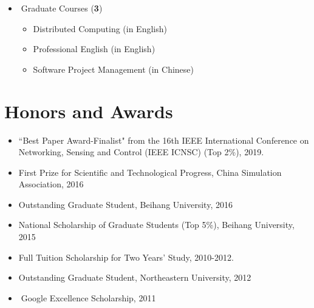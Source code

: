 \documentclass[margin,line]{res}
\begin{document}
\begin{resume}
\begin{itemize}
	\item Graduate Courses (\textbf{3})
	\begin{itemize}
		\item Distributed Computing (in English)
		\item Professional English (in English)
		\item Software Project Management (in Chinese)
	\end{itemize}
\end{itemize}

\section{\sc Honors and Awards}

\begin{itemize}
	\item ``Best Paper Award-Finalist" from the 16th IEEE International Conference on Networking, Sensing and Control (IEEE ICNSC) (Top 2\%), 2019.
	\item First Prize for Scientific and Technological Progress, China Simulation Association, 2016
	\item Outstanding Graduate Student, Beihang University, 2016
	\item National Scholarship of Graduate Students (Top 5\%), Beihang University, 2015
	\item Full Tuition Scholarship for Two Years' Study, 2010-2012.
	\item Outstanding Graduate Student, Northeastern University, 2012
	\item Google Excellence Scholarship, 2011
\end{itemize}

%
%
%
%
%
%


\end{resume}
\end{document}
